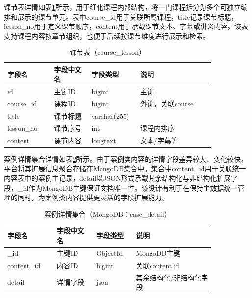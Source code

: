 课节表详情如表\ref{tab:db_course_lesson}所示，用于细化课程内部结构，将一门课程拆分为多个可独立编排和展示的课节单元。表中course\_\allowbreak id用于关联所属课程，title记录课节标题，lesson\_\allowbreak no用于定义课节顺序，content用于承载课节文本、字幕或讲义内容。该表支持课程内容按章节组织，也便于后续按课节维度进行展示和检索。

\begin{table}[!htbp]
  \centering
  \caption{课节表（course\_lesson）}
  \label{tab:db_course_lesson}
  \small
  \begin{tabular}{>{\raggedright\arraybackslash}p{0.20\linewidth}|>{\raggedright\arraybackslash}p{0.16\linewidth}|>{\raggedright\arraybackslash}p{0.16\linewidth}|>{\raggedright\arraybackslash}p{0.32\linewidth}}
    \hline
    字段名 & 字段中文名 & 字段类型 & 说明 \\ \hline
    id & 主键ID & bigint & 主键 \\ \hline
    course\_id & 课程ID & bigint & 外键，关联course \\ \hline
    title & 课节标题 & varchar(255) & \\ \hline
    lesson\_no & 课节序号 & int & 课程内排序 \\ \hline
    content & 课节内容 & longtext & 文本/字幕等 \\ \hline
  \end{tabular}
\end{table}

案例详情集合详情如表\ref{tab:db_case_detail_mongo}所示。由于案例类内容的详情字段差异较大、变化较快，平台将其扩展信息聚合存储在MongoDB集合中。集合中content\_\allowbreak id用于关联统一内容表中的案例主记录，detail以JSON形式承载其余结构化与非结构化扩展字段，\_\allowbreak id作为MongoDB主键保证文档唯一性。该设计有利于在保持主数据统一管理的同时，为案例类内容提供更灵活的字段扩展能力。

\begin{table}[!htbp]
  \centering
  \caption{案例详情集合（MongoDB：case\_detail）}
  \label{tab:db_case_detail_mongo}
  \small
  \begin{tabular}{>{\raggedright\arraybackslash}p{0.20\linewidth}|>{\raggedright\arraybackslash}p{0.16\linewidth}|>{\raggedright\arraybackslash}p{0.16\linewidth}|>{\raggedright\arraybackslash}p{0.32\linewidth}}
    \hline
    字段名 & 字段中文名 & 字段类型 & 说明 \\ \hline
    \_id & 主键ID & ObjectId & MongoDB主键 \\ \hline
    content\_id & 内容ID & bigint & 关联content.id \\ \hline
    detail & 详情字段 & json & 其余结构化/非结构化字段 \\ \hline
  \end{tabular}
\end{table}

